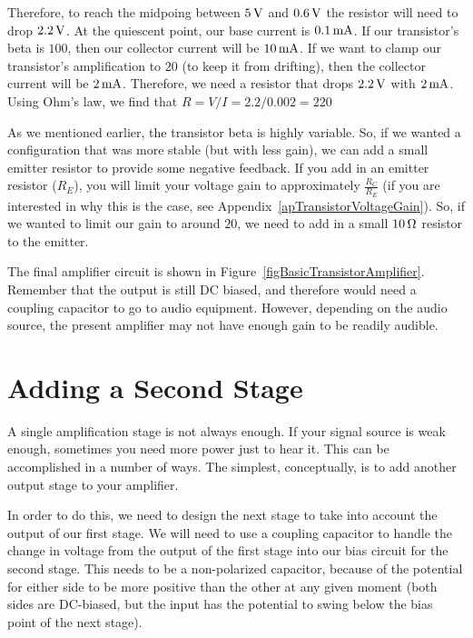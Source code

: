 Therefore, to reach the midpoing between $5\,\si{\volt}$ and $0.6\,\si{\volt}$ the resistor will need to drop $2.2\,\si{\volt}$.
At the quiescent point, our base current is $0.1\,\si{\milli\ampere}$.
If our transistor's beta is $100$, then our collector current will be $10\,\si{\milli\ampere}$.
If we want to clamp our transistor's amplification to $20$ (to keep it from drifting), then the collector current will be $2\,\si{\milli\ampere}$.
Therefore, we need a resistor that drops $2.2\,\si{\volt}$ with $2\,\si{\milli\ampere}$.
Using Ohm's law, we find that $R = V / I = 2.2 / 0.002 = 220$

As we mentioned earlier, the transistor beta is highly variable.
So, if we wanted a configuration that was more stable (but with less gain), we can add a small emitter resistor to provide some negative feedback.
If you add in an emitter resistor ($R_E$), you will limit your voltage gain to approximately $\frac{R_C}{R_E}$ (if you are interested in why this is the case, see Appendix~\ref{apTransistorVoltageGain}).
So, if we wanted to limit our gain to around $20$, we need to add in a small $10\,\si{\ohm}$ resistor to the emitter.


The final amplifier circuit is shown in Figure~\ref{figBasicTransistorAmplifier}.
Remember that the output is still DC biased, and therefore would need a coupling capacitor to go to audio equipment.
However, depending on the audio source, the present amplifier may not have enough gain to be readily audible.

\section{Adding a Second Stage}
\label{secMultiStageAmp}

A single amplification stage is not always enough.
If your signal source is weak enough, sometimes you need more power just to hear it.
This can be accomplished in a number of ways.
The simplest, conceptually, is to add another output stage to your amplifier.

In order to do this, we need to design the next stage to take into account the output of our first stage.
We will need to use a coupling capacitor to handle the change in voltage from the output of the first stage into our bias circuit for the second stage.
This needs to be a non-polarized capacitor, because of the potential for either side to be more positive than the other at any given moment (both sides are DC-biased, but the input has the potential to swing below the bias point of the next stage).

